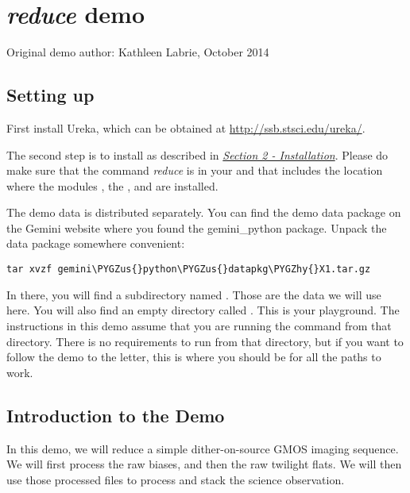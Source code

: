 \documentclass[letterpaper,10pt,english]{sphinxmanual}
\def\PYGZus{\char`\_}
\def\PYGZhy{\char`\-}
\begin{document}
\chapter{\emph{reduce} demo}
\label{appendices/appendix_demo::doc}\label{appendices/appendix_demo:reduce-demo}
Original demo author: Kathleen Labrie, October 2014


\section{Setting up}
\label{appendices/appendix_demo:setting-up}
First install Ureka, which can be obtained at \href{http://ssb.stsci.edu/ureka/}{http://ssb.stsci.edu/ureka/}.

The second step is to install  as described in
{\hyperref[userenv:config]{\emph{Section 2 - Installation}}}.
Please do make sure that the command \emph{reduce} is in your  and that
 includes the location where the modules , the
, and  are installed.

The demo data is distributed separately.  You can find the demo data package
 on the Gemini website where you found the
gemini\_python package.  Unpack the data package somewhere convenient:

\begin{Verbatim}[commandchars=\\\{\}]
tar xvzf gemini\PYGZus{}python\PYGZus{}datapkg\PYGZhy{}X1.tar.gz
\end{Verbatim}

In there, you will find a subdirectory named .  Those are
the data we will use here.  You will also find an empty directory called
.  This is your playground. The instructions in this demo assume that
you are running the  command from that directory.  There is no requirements
to run  from that directory, but if you want to follow the demo to the
letter, this is where you should be for all the paths to work.


\section{Introduction to the Demo}
\label{appendices/appendix_demo:introduction-to-the-demo}
In this demo, we will reduce a simple dither-on-source GMOS imaging sequence.
We will first process the raw biases, and then the raw twilight flats.  We will
then use those processed files to process and stack the science observation.
\end{document}
